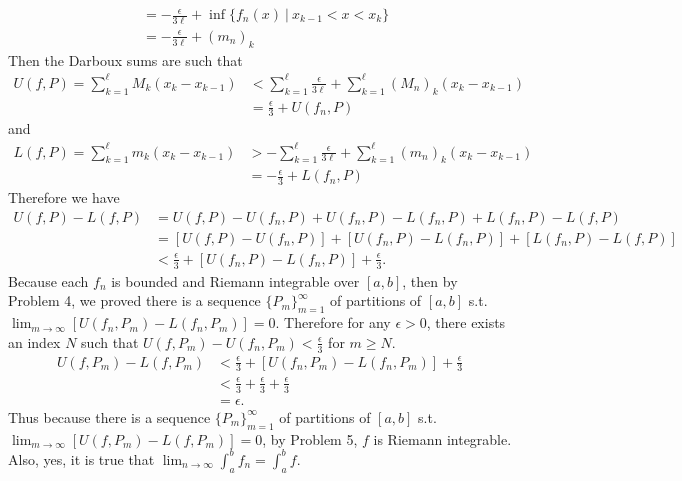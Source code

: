 \begin{enumerate}
\begin{align*}
        &=-\frac{\epsilon}{3\ell}+\inf\{f_n(x)\ |\ x_{k-1}<x<x_k\}\\
        &=-\frac{\epsilon}{3\ell}+(m_n)_k
    \end{align*}
    Then the Darboux sums are such that
    \begin{align*}
        U(f,P)=\sum_{k=1}^\ell M_k(x_k-x_{k-1})&<\sum_{k=1}^\ell\frac{\epsilon}{3\ell}+\sum_{k=1}^\ell(M_n)_k(x_k-x_{k-1})\\
        &=\frac{\epsilon}{3}+U(f_n,P)
    \end{align*}
    and 
    \begin{align*}
        L(f,P)=\sum_{k=1}^\ell m_k(x_k-x_{k-1})&>-\sum_{k=1}^\ell\frac{\epsilon}{3\ell}+\sum_{k=1}^\ell(m_n)_k(x_k-x_{k-1})\\
        &=-\frac{\epsilon}{3}+L(f_n,P)
    \end{align*}
    Therefore we have
    \begin{align*}
        U(f,P)-L(f,P)&=U(f,P)-U(f_n,P)+U(f_n,P)-L(f_n,P)+L(f_n,P)-L(f,P)\\
        &=[U(f,P)-U(f_n,P)]+[U(f_n,P)-L(f_n,P)]+[L(f_n,P)-L(f,P)]\\
        &<\frac{\epsilon}{3}+[U(f_n,P)-L(f_n,P)]+\frac{\epsilon}{3}.
    \end{align*}
    Because each $f_n$ is bounded and Riemann integrable over $[a,b]$, then by Problem 4, we proved there is a sequence $\{P_m\}_{m=1}^\infty$ of partitions of $[a,b]$ s.t. $\lim_{m\to\infty}[U(f_n,P_m)-L(f_n,P_m)]=0$.
    Therefore for any $\epsilon>0$, there exists an index $N$ such that $U(f,P_m)-U(f_n,P_m)<\frac{\epsilon}{3}$ for $m\ge N$.
    \begin{align*}
        U(f,P_m)-L(f,P_m)&<\frac{\epsilon}{3}+[U(f_n,P_m)-L(f_n,P_m)]+\frac{\epsilon}{3}\\
        &<\frac{\epsilon}{3}+\frac{\epsilon}{3}+\frac{\epsilon}{3}\\
        &=\epsilon.
    \end{align*}
    Thus because there is a sequence $\{P_m\}_{m=1}^\infty$ of partitions of $[a,b]$ s.t. $\lim_{m\to\infty}[U(f,P_m)-L(f,P_m)]=0$, by Problem 5, $f$ is Riemann integrable.
    \\Also, yes, it is true that $\lim_{n\to\infty}\int_a^bf_n=\int_a^bf$.
\end{enumerate}

